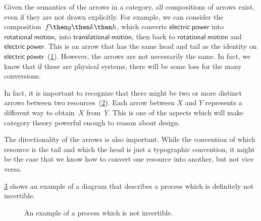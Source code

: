 Given the semantics of the arrows in a category, all compositions of arrows exist, even if they are not drawn
explicitly. For example, we can consider the composition~$f\then g \then k \then h$, which
converts $\mathsf{electric}\ \mathsf{power}$ into $\mathsf{rotational}\ \mathsf{motion}$, into $\mathsf{translational}\ \mathsf{motion}$, then back to
$\mathsf{rotational}\ \mathsf{motion}$ and $\mathsf{electric}\ \mathsf{power}$. This is an arrow that has the same head and tail as the identity on $\mathsf{electric}\ \mathsf{power}$~(\cref{fig:e8}). However, the arrows are not necessarily the same. In fact, we know that if these are physical systems, there will be some loss for the many conversions.

\begin{figure}[h!]
    \centering
    \caption{\label{fig:e8}}
\end{figure}

In fact, it is important to recognize that there might be two or more distinct arrows between two resources~(\cref{fig:e9}). Each arrow between $X$ and $Y$ represents a different way  to obtain~$X$ from~$Y$. This is one of the aspects which will make category theory powerful enough to reason about design.

\begin{figure}[h!]
    \centering
    \caption{\label{fig:e9}}
\end{figure}

The directionality of the arrows is also important. While the convention of
which resource is the tail and which the head is just a typographic convention,
it might be the case that we know how to convert one resource into another, but
not vice versa.

\cref{fig:e10} shows an example of a diagram that describes a process which is definitely
not invertible.

\begin{figure}[h!]
    \centering
    \caption{An example of a process which is not invertible. \label{fig:e10}}
\end{figure}

